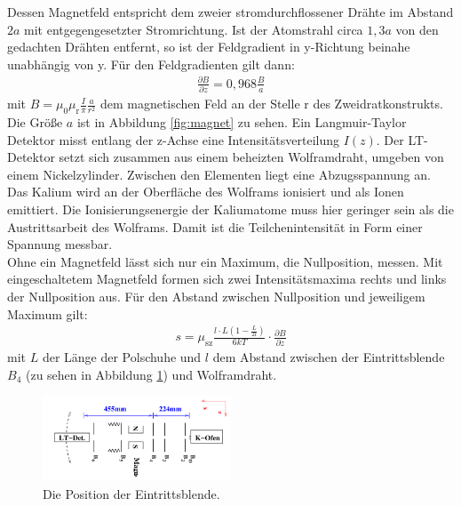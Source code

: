 Dessen Magnetfeld entspricht dem zweier stromdurchflossener Drähte im Abstand $2a$
mit entgegengesetzter Stromrichtung.
Ist der Atomstrahl circa $1,3a$ von den gedachten Drähten entfernt, so ist
der Feldgradient in y-Richtung beinahe unabhängig von y.
Für den Feldgradienten gilt dann:
\begin{align}
  \frac{\partial B}{\partial z}=0,968\frac{B}{a}\label{eqn:grad}
\end{align}
mit $B=\mu_\mathrm{0}\mu_\mathrm{r}\frac{I}{\pi}\frac{a}{r^2}$ dem magnetischen
Feld an der Stelle r des Zweidratkonstrukts. Die Größe $a$ ist in Abbildung \ref{fig:magnet} zu sehen.
Ein Langmuir-Taylor Detektor misst entlang der z-Achse eine Intensitätsverteilung $I(z)$.
Der LT-Detektor setzt sich zusammen aus einem beheizten Wolframdraht, umgeben
von einem Nickelzylinder. Zwischen den Elementen liegt eine Abzugsspannung an.
Das Kalium wird an der Oberfläche des Wolframs
ionisiert und als Ionen emittiert. Die Ionisierungsenergie der Kaliumatome
muss hier geringer sein als die Austrittsarbeit des Wolframs.
Damit ist die Teilchenintensität in Form einer Spannung messbar.\\
Ohne ein Magnetfeld lässt sich nur ein
Maximum, die Nullposition, messen. Mit eingeschaltetem Magnetfeld formen sich zwei Intensitätsmaxima
rechts und links der Nullposition aus.
Für den Abstand zwischen Nullposition und jeweiligem Maximum gilt:
\begin{align}
 s=\mu_\mathrm{sz}\frac{l\cdot L\left(1-\frac{L}{2l}\right)}{6kT}\cdot\frac{\partial B}{\partial z} \label{eqn:abstand}
\end{align}
mit $L$ der Länge der Polschuhe und $l$ dem Abstand zwischen
der Eintrittsblende $B_\mathrm{4}$ (zu sehen in Abbildung \ref{fig:schema}) und Wolframdraht.
\begin{figure}
   \centering
    \includegraphics[width=0.5\textwidth]{schema.PNG}
    \caption{Die Position der Eintrittsblende.\cite{skript}}
    \label{fig:schema}
    \FloatBarrier
\end{figure}
